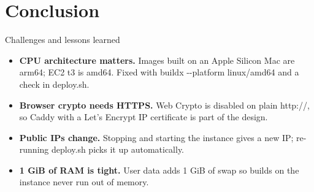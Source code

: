 \documentclass[aspectratio=169,11pt]{beamer}
\newcommand{\hl}[1]{\textcolor{cobalt}{\textbf{#1}}}
\newcommand{\code}[1]{{\ttfamily\small #1}}
\begin{document}
\section{Conclusion}
\begin{frame}{Challenges and lessons learned}
  \begin{itemize}
    \item \hl{CPU architecture matters.} Images built on an Apple Silicon Mac are \code{arm64}; EC2 t3 is \code{amd64}. Fixed with \code{buildx -{}-platform linux/amd64} and a check in \code{deploy.sh}.
    \item \hl{Browser crypto needs HTTPS.} Web Crypto is disabled on plain \code{http://}, so Caddy with a Let's Encrypt IP certificate is part of the design.
    \item \hl{Public IPs change.} Stopping and starting the instance gives a new IP; re-running \code{deploy.sh} picks it up automatically.
    \item \hl{1 GiB of RAM is tight.} User data adds 1 GiB of swap so builds on the instance never run out of memory.
  \end{itemize}
\end{frame}
\end{document}
